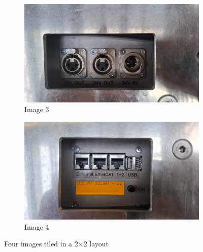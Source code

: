 \begin{figure}[ht]
        \begin{subfigure}[t]{0.49\linewidth}
            \centering
            \includegraphics[width=\linewidth]{images/sec2/youbot_power.jpg}
            \caption{Image 3}
        \end{subfigure}
        \hfill
        \begin{subfigure}[t]{0.49\linewidth}
            \centering
            \includegraphics[width=\linewidth]{images/sec2/youbot_screen.jpg}
            \caption{Image 4}
        \end{subfigure}

        \caption{Four images tiled in a 2×2 layout}
        \label{fig:youbot-quad}
    \end{figure}

   

